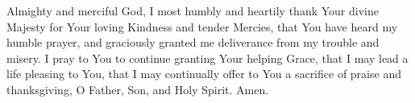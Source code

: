 Almighty and merciful God, I most humbly and heartily thank Your divine Majesty for Your loving Kindness and tender Mercies, that You have heard my humble prayer, and graciously granted me deliverance from my trouble and misery.
I pray to You to continue granting Your helping Grace, that I may lead a life pleasing to You, that I may continually offer to You a sacrifice of praise and thanksgiving, O Father, Son, and Holy Spirit.
Amen.


\newpage